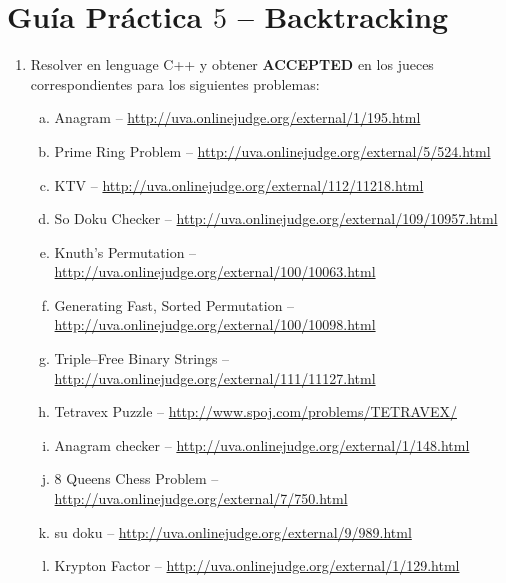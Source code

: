 




\section*{Gu\'ia Pr\'actica $5$ -- Backtracking}

\begin{enumerate}[1 -]
	
	\item Resolver en lenguage C++ y obtener \textbf{ACCEPTED} en los jueces correspondientes para los siguientes problemas:
	
	\begin{enumerate}[a)]
		\item Anagram -- \href{http://uva.onlinejudge.org/external/1/195.html}{http://uva.onlinejudge.org/external/1/195.html}
		\item Prime Ring Problem -- \href{http://uva.onlinejudge.org/external/5/524.html}{http://uva.onlinejudge.org/external/5/524.html}
		\item KTV -- \href{http://uva.onlinejudge.org/external/112/11218.html}{http://uva.onlinejudge.org/external/112/11218.html}
		\item So Doku Checker -- \href{http://uva.onlinejudge.org/external/109/10957.html}{http://uva.onlinejudge.org/external/109/10957.html}		
		\item Knuth’s Permutation -- \href{http://uva.onlinejudge.org/external/100/10063.html}{http://uva.onlinejudge.org/external/100/10063.html}
		\item Generating Fast, Sorted Permutation -- \href{http://uva.onlinejudge.org/external/100/10098.html}{http://uva.onlinejudge.org/external/100/10098.html}
		\item Triple--Free Binary Strings -- \href{http://uva.onlinejudge.org/external/111/11127.html}{http://uva.onlinejudge.org/external/111/11127.html}
		\item Tetravex Puzzle -- \href{http://www.spoj.com/problems/TETRAVEX/}{http://www.spoj.com/problems/TETRAVEX/}
		\item Anagram checker -- \href{http://uva.onlinejudge.org/external/1/148.html}{http://uva.onlinejudge.org/external/1/148.html}
		\item 8 Queens Chess Problem  -- \href{http://uva.onlinejudge.org/external/7/750.html}{http://uva.onlinejudge.org/external/7/750.html}
		\item su doku -- \href{http://uva.onlinejudge.org/external/9/989.html}{http://uva.onlinejudge.org/external/9/989.html}
		\item Krypton Factor -- \href{http://uva.onlinejudge.org/external/1/129.html}{http://uva.onlinejudge.org/external/1/129.html}
	\end{enumerate}

\end{enumerate}






